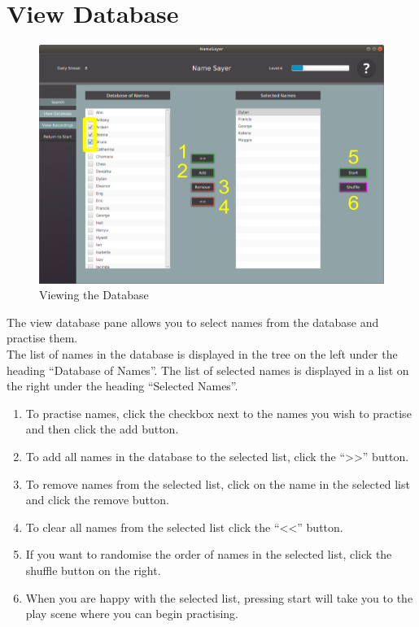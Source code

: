 \documentclass[a4paper,12pt]{article}
\begin{document}
\section{View Database}
\begin{figure}[!h]
	\includegraphics[width=\linewidth]{viewdb.png}
	\caption{Viewing the Database}
\end{figure}
The view database pane allows you to select names from the database and practise them.
\\ 

The list of names in the database is displayed in the tree on the left under the heading “Database of Names”. The list of selected names is displayed in a list on the right under the heading “Selected Names”.

\begin{enumerate}[label=\textbf{\arabic*}]
	\item To practise names, click the checkbox next to the names you wish to practise and then click the add button.
	
	\item To add all names in the database to the selected list, click the “>>” button. 
	
	\item To remove names from the selected list, click on the name in the selected list and click the remove button.
	
	\item To clear all names from the selected list click the “<<” button.
	
	\item If you want to randomise the order of names in the selected list, click the shuffle button on the right.
	
	\item When you are happy with the selected list, pressing start will take you to the play scene where you can begin practising.
\end{enumerate}
\newpage
\end{document}
